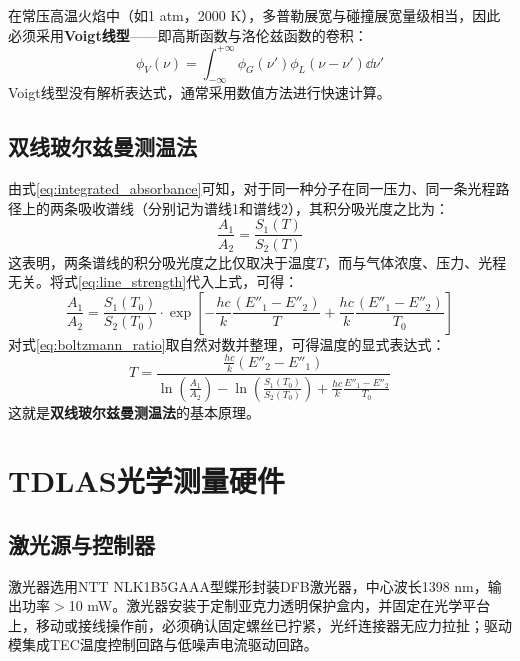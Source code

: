 在常压高温火焰中（如1 atm，2000 K），多普勒展宽与碰撞展宽量级相当，因此必须采用\textbf{Voigt线型}——即高斯函数与洛伦兹函数的卷积：
\begin{equation}
	\phi_V(\nu) = \int_{-\infty}^{+\infty} \phi_G(\nu') \phi_L(\nu - \nu') \dd\nu'
	\label{eq:voigt}
\end{equation}
Voigt线型没有解析表达式，通常采用数值方法进行快速计算。

\subsection{双线玻尔兹曼测温法}

由式\eqref{eq:integrated_absorbance}可知，对于同一种分子在同一压力、同一条光程路径上的两条吸收谱线（分别记为谱线1和谱线2），其积分吸光度之比为：
\begin{equation}
	\frac{A_1}{A_2} = \frac{S_1(T)}{S_2(T)}
	\label{eq:ratio_area}
\end{equation}
这表明，两条谱线的积分吸光度之比仅取决于温度$T$，而与气体浓度、压力、光程无关。将式\eqref{eq:line_strength}代入上式，可得：
\begin{equation}
	\frac{A_1}{A_2} = \frac{S_1(T_0)}{S_2(T_0)} \cdot \exp\left[-\frac{hc}{k} \frac{(E''_1 - E''_2)}{T} + \frac{hc}{k} \frac{(E''_1 - E''_2)}{T_0}\right]
	\label{eq:boltzmann_ratio}
\end{equation}
对式\eqref{eq:boltzmann_ratio}取自然对数并整理，可得温度的显式表达式：
\begin{equation}
	T = \frac{\frac{hc}{k} (E''_2 - E''_1)}{\ln\left(\frac{A_1}{A_2}\right) - \ln\left(\frac{S_1(T_0)}{S_2(T_0)}\right) + \frac{hc}{k} \frac{E''_1 - E''_2}{T_0}}
	\label{eq:temperature_explicit}
\end{equation}
这就是\textbf{双线玻尔兹曼测温法}的基本原理。


\section{TDLAS光学测量硬件}

\subsection{激光源与控制器}

激光器选用NTT NLK1B5GAAA型蝶形封装DFB激光器，中心波长1398 nm，输出功率$>$10 mW。激光器安装于定制亚克力透明保护盒内，并固定在光学平台上，移动或接线操作前，必须确认固定螺丝已拧紧，光纤连接器无应力拉扯；驱动模集成TEC温度控制回路与低噪声电流驱动回路。

